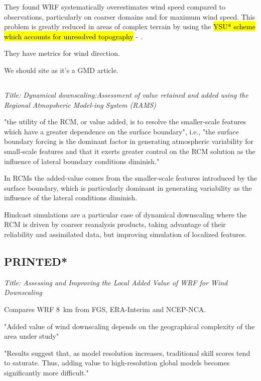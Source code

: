 \documentclass[12pt,a4paper]{article}
\begin{document}
They found WRF systematically overestimates wind speed compared to observations, particularly on coarser domains and for maximum wind speed. This problem is greatly reduced in areas of complex terrain by using the \hl{YSU* scheme which accounts for unresolved topography} - \cite{Jimenez2012}. 

They have metrics for wind direction.

We should site as it's a GMD article.

\subsection{\cite{Castro2005}}

\textit{Title: Dynamical downscaling:Assessment of value retained and added using the Regional Atmopsheric Model-ing System (RAMS)}

"the utility of the RCM, or value added, is to resolve the smaller-scale features which have a greater dependence on the surface boundary", i.e., "the surface boundary forcing is the dominant factor in generating atmospheric variability for small-scale features and that it exerts greater control on the RCM solution as the influence of lateral boundary conditions diminish."

In RCMs the added-value comes from the smaller-scale features introduced by the surface boundary, which is particularly dominant in generating variability as the influence of the lateral conditions diminish. 

Hindcast simulations are a particular case of dynamical downscaling where the RCM is driven by coarser reanalysis products, taking advantage of their reliability and assimilated data, but improving simulation of localized features.

\subsection{\cite{Garcia-Diez2015} PRINTED*}

\textit{Title: Assessing and Improving the Local Added Value of WRF for Wind Downscaling}

Compares WRF 8~km from FGS, ERA-Interim and NCEP-NCA. 

"Added value of wind downscaling depends on the geographical complexity of the area under study" 

"Results suggest that, as model resolution increases, traditional skill scores tend to saturate. Thus, adding value to high-resolution global models becomes significantly more difficult." 
\end{document}
